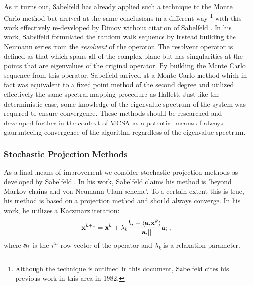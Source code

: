 As it turns out, Sabelfeld has already applied such a technique to the
Monte Carlo method but arrived at the same conclusions in a different
way \cite{sabelfeld_sparsified_2009}\footnote{Although the technique
  is outlined in this document, Sabelfeld cites his previous work in
  this area in 1982.} with this work effectively re-developed by Dimov
without citation of Sabelfeld
\cite{dimov_parallel_2001,dimov_new_1998}. In his work, Sabelfeld
formulated the random walk sequence by instead building the Neumann
series from the \textit{resolvent} of the operator. The resolvent
operator is defined as that which spans all of the complex plane but
has singularities at the points that are eigenvalues of the original
operator. By building the Monte Carlo sequence from this operator,
Sabelfeld arrived at a Monte Carlo method which in fact was equivalent
to a fixed point method of the second degree and utilized effectively
the same spectral mapping procedure as Hallett. Just like the
deterministic case, some knowledge of the eigenvalue spectrum of the
system was required to ensure convergence. These methods should be
researched and developed further in the context of MCSA as a potential
means of always gauranteeing convergence of the algorithm regardless
of the eigenvalue spectrum.

\subsubsection{Stochastic Projection Methods}
\label{subsubsec:stochastic_projection_methods}

As a final means of improvement we consider stochastic projection
methods as developed by Sabelfeld \cite{hutchison_stochastic_2011}. In
his work, Sabelfeld claims his method is 'beyond Markov chains and von
Neumann-Ulam scheme'. To a certain extent this is true, his method is
based on a projection method and should always converge. In his work,
he utilizes a Kaczmarz iteration:
\begin{equation}
  \mathbf{x}^{k+1} = \mathbf{x}^k + \lambda_k \frac{b_i - \langle \mathbf{a}_i
    \mathbf{x}^k \rangle}{||\mathbf{a}_i||}\mathbf{a}_i\:,
  \label{eq:kaczmarz_iteration}
\end{equation}
where $\mathbf{a}_i$ is the $i^{th}$ row vector of the operator and
$\lambda_k$ is a relaxation parameter.


